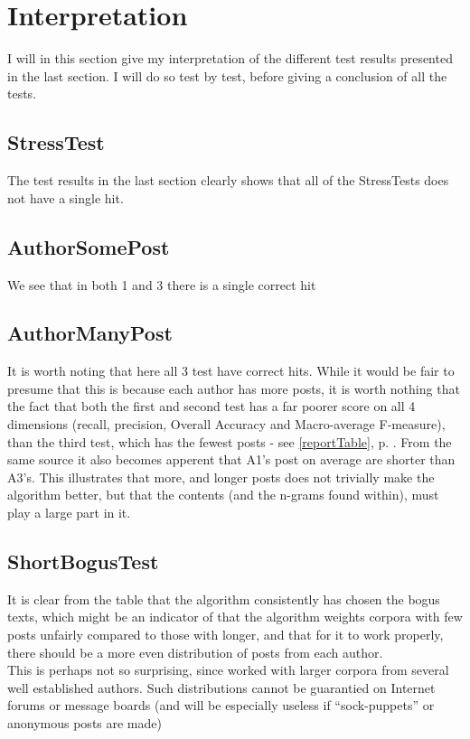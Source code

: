\section{Interpretation}
I will in this section give my interpretation of the different test results presented in the last section. I will do so test by test, before giving a conclusion of all the tests.

\subsection{StressTest}
The test results in the last section clearly shows that all of the StressTests does not have a single hit.

\subsection{AuthorSomePost}
We see that in both 1 and 3 there is a single correct hit


\subsection{AuthorManyPost}
It is worth noting that here all 3 test have correct hits. While it would be fair to presume that this is because each author has more posts, it is worth nothing that the fact that both the first and second test has a far poorer score on all 4 dimensions (recall, precision, Overall Accuracy and Macro-average F-measure), than the third test, which has the fewest posts - see \ref{reportTable}, p. \pageref{reportTable}. From the same source it also becomes apperent that A1's post on average are shorter than A3's. This illustrates that more, and longer posts does not trivially make the algorithm better, but that the contents (and the n-grams found within), must play a large part in it.

\subsection{ShortBogusTest}
It is clear from the table that the algorithm consistently has chosen the bogus texts, which might be an indicator of that the algorithm weights corpora with few posts unfairly compared to those with longer, and that for it to work properly, there should be a more even distribution of posts from each author.\\

This is perhaps not so surprising, since \cite{nr4} worked with larger corpora from several well established authors. Such distributions cannot be guarantied on Internet forums or message boards (and will be especially useless if ``sock-puppets'' or anonymous posts are made) 


